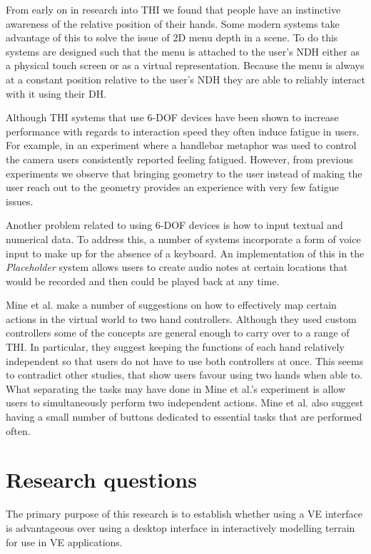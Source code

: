 \documentclass{sig-alternate-05-2015}
\begin{document}
From early on in research into THI we found that people have an instinctive awareness of the relative position of their hands\cite{Bowman1998, Buxton1986}. Some modern systems take advantage of this to solve the issue of 2D menu depth in a scene. To do this systems are designed such that the menu is attached to the user's NDH either as a physical touch screen\cite{Wang2013,Mine2014} or as a virtual representation\cite{Jerald2013}. Because the menu is always at a constant position relative to the user's NDH they are able to reliably interact with it using their DH.

Although THI systems that use 6-DOF devices have been shown to increase performance with regards to interaction speed\cite{Schultheis2012} they often induce fatigue in users. For example, in an experiment where a handlebar metaphor was used to control the camera users consistently reported feeling fatigued\cite{Song2012}. However, from previous experiments we observe that bringing geometry to the user instead of making the user reach out to the geometry provides an experience with very few fatigue issues\cite{Jerald2013}.

Another problem related to using 6-DOF devices is how to input textual and numerical data. To address this, a number of systems incorporate a form of voice input to make up for the absence of a keyboard\cite{Ponto2013,Toma2012}. An implementation of this in the \textit{Placeholder} system\cite{Laurel1994} allows users to create audio notes at certain locations that would be recorded and then could be played back at any time.

Mine et al. make a number of suggestions on how to effectively map certain actions in the virtual world to two hand controllers\cite{Mine2014}. Although they used custom controllers some of the concepts are general enough to carry over to a range of THI. In particular, they suggest keeping the functions of each hand relatively independent so that users do not have to use both controllers at once. This seems to contradict other studies, that show users favour using two hands when able to\cite{Buxton1986,Hinckley1994}. What separating the tasks may have done in Mine et al.'s experiment is allow users to simultaneously perform two independent actions.  Mine et al. also suggest having a small number of buttons dedicated to essential tasks that are performed often\cite{Mine2014}.
\section{Research questions}
The primary purpose of this research is to establish whether using a VE interface is advantageous over using a desktop interface in interactively modelling terrain for use in VE applications.
\end{document}
